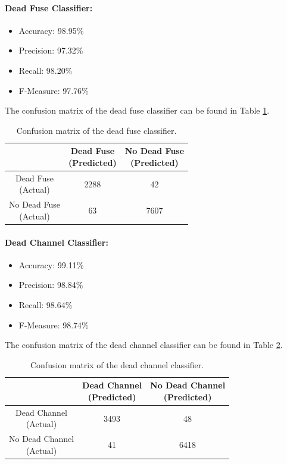 \paragraph{Dead Fuse Classifier:}
\begin{itemize}
  \item Accuracy: 98.95\%
  \item Precision: 97.32\%
  \item Recall: 98.20\%
  \item F-Measure: 97.76\%
\end{itemize}
The confusion matrix of the dead fuse classifier can be found in Table
\ref{tbl:confusion-fuse}.
\begin{table}[h]
  \centering
  \renewcommand\theadfont{\bfseries}
  \begin{tabular}{|c|c|c|}
    \hline
    & \thead{Dead Fuse\\(Predicted)} & \thead{No Dead Fuse\\(Predicted)} \\
    \hline
    \thead{Dead Fuse\\(Actual)} & 2288 & 42\\
    \hline
    \thead{No Dead Fuse\\(Actual)} & 63 & 7607\\
    \hline
  \end{tabular}
  \caption{Confusion matrix of the dead fuse classifier.}
  \label{tbl:confusion-fuse}
\end{table}

\paragraph{Dead Channel Classifier:}
\begin{itemize}
  \item Accuracy: 99.11\%
  \item Precision: 98.84\%
  \item Recall: 98.64\%
  \item F-Measure: 98.74\%
\end{itemize}
The confusion matrix of the dead channel classifier can be found in Table
\ref{tbl:confusion-channel}.
\begin{table}[h]
  \centering
  \renewcommand\theadfont{\bfseries}
  \begin{tabular}{|c|c|c|}
    \hline
    & \thead{Dead Channel\\(Predicted)} & \thead{No Dead Channel\\(Predicted)} \\
    \hline
    \thead{Dead Channel\\(Actual)} & 3493 & 48\\
    \hline
    \thead{No Dead Channel\\(Actual)} & 41 & 6418\\
    \hline
  \end{tabular}
  \caption{Confusion matrix of the dead channel classifier.}
  \label{tbl:confusion-channel}
\end{table}

